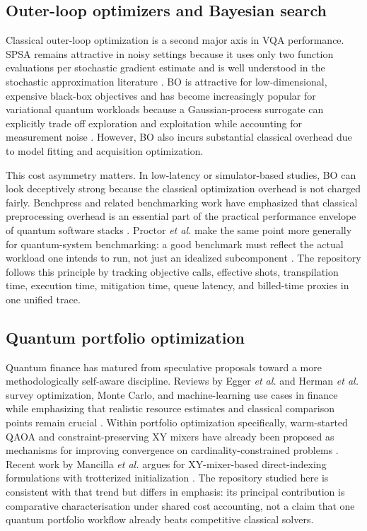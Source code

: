 \documentclass[11pt]{article}
\begin{document}
\subsection{Outer-loop optimizers and Bayesian search}

Classical outer-loop optimization is a second major axis in VQA performance. SPSA remains attractive in noisy settings because it uses only two function evaluations per stochastic gradient estimate and is well understood in the stochastic approximation literature \cite{spall1992spsa}. BO is attractive for low-dimensional, expensive black-box objectives and has become increasingly popular for variational quantum workloads because a Gaussian-process surrogate can explicitly trade off exploration and exploitation while accounting for measurement noise \cite{balandat2020botorch}. However, BO also incurs substantial classical overhead due to model fitting and acquisition optimization.

This cost asymmetry matters. In low-latency or simulator-based studies, BO can look deceptively strong because the classical optimization overhead is not charged fairly. Benchpress and related benchmarking work have emphasized that classical preprocessing overhead is an essential part of the practical performance envelope of quantum software stacks \cite{nation2025benchpress,zhu2025quest}. Proctor \emph{et al.} make the same point more generally for quantum-system benchmarking: a good benchmark must reflect the actual workload one intends to run, not just an idealized subcomponent \cite{proctor2025benchmarking}. The repository follows this principle by tracking objective calls, effective shots, transpilation time, execution time, mitigation time, queue latency, and billed-time proxies in one unified trace.

\subsection{Quantum portfolio optimization}

Quantum finance has matured from speculative proposals toward a more methodologically self-aware discipline. Reviews by Egger \emph{et al.} and Herman \emph{et al.} survey optimization, Monte Carlo, and machine-learning use cases in finance while emphasizing that realistic resource estimates and classical comparison points remain crucial \cite{egger2020finance,herman2023finance}. Within portfolio optimization specifically, warm-started QAOA and constraint-preserving \(\mathrm{XY}\) mixers have already been proposed as mechanisms for improving convergence on cardinality-constrained problems \cite{egger2021warm,he2023alignment,mancilla2026portfolio}. Recent work by Mancilla \emph{et al.} argues for \(\mathrm{XY}\)-mixer-based direct-indexing formulations with trotterized initialization \cite{mancilla2026portfolio}. The repository studied here is consistent with that trend but differs in emphasis: its principal contribution is comparative characterisation under shared cost accounting, not a claim that one quantum portfolio workflow already beats competitive classical solvers.
\end{document}
